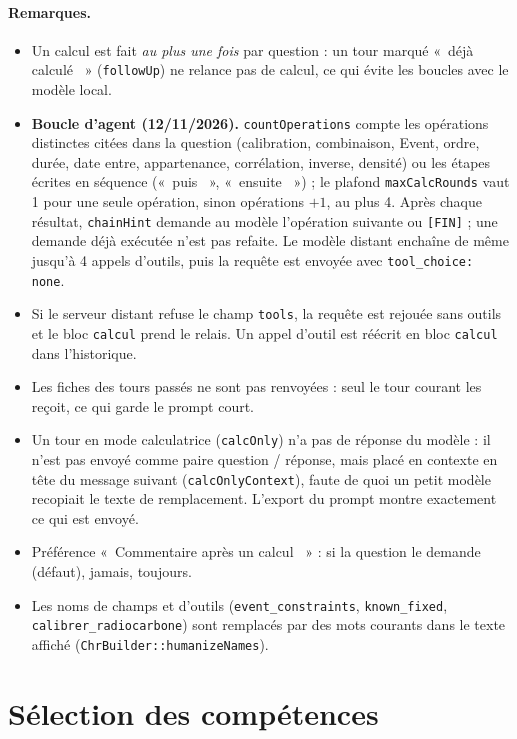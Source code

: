 \documentclass[11pt,a4paper]{article}
\providecommand{\og}{«~}\providecommand{\fg}{\unskip~»}
\newcommand{\code}[1]{\texttt{\small #1}}
\begin{document}
\paragraph{Remarques.}
\begin{itemize}[leftmargin=*]
\item Un calcul est fait \emph{au plus une fois} par question : un tour marqué \og déjà calculé \fg{} (\code{followUp})
  ne relance pas de calcul, ce qui évite les boucles avec le modèle local.
\item \textbf{Boucle d'agent (12/11/2026).} \code{countOperations} compte les opérations distinctes citées dans la
  question (calibration, combinaison, Event, ordre, durée, date entre, appartenance, corrélation, inverse, densité) ou
  les étapes écrites en séquence (\og puis \fg, \og ensuite \fg) ; le plafond \code{maxCalcRounds} vaut 1 pour une
  seule opération, sinon opérations $+1$, au plus 4. Après chaque résultat, \code{chainHint} demande au modèle
  l'opération suivante ou \code{[FIN]} ; une demande déjà exécutée n'est pas refaite. Le modèle distant enchaîne de
  même jusqu'à 4 appels d'outils, puis la requête est envoyée avec \code{tool\_choice: none}.
\item Si le serveur distant refuse le champ \code{tools}, la requête est rejouée sans outils et le bloc \code{calcul}
  prend le relais. Un appel d'outil est réécrit en bloc \code{calcul} dans l'historique.
\item Les fiches des tours passés ne sont pas renvoyées : seul le tour courant les reçoit, ce qui garde le prompt court.
\item Un tour en mode calculatrice (\code{calcOnly}) n'a pas de réponse du modèle : il n'est pas envoyé comme paire
  question / réponse, mais placé en contexte en tête du message suivant (\code{calcOnlyContext}), faute de quoi un petit
  modèle recopiait le texte de remplacement. L'export du prompt montre exactement ce qui est envoyé.
\item Préférence \og Commentaire après un calcul \fg{} : si la question le demande (défaut), jamais, toujours.
\item Les noms de champs et d'outils (\code{event\_constraints}, \code{known\_fixed}, \code{calibrer\_radiocarbone})
  sont remplacés par des mots courants dans le texte affiché (\code{ChrBuilder::humanizeNames}).
\end{itemize}

\section{Sélection des compétences}\label{sec:skills}
\end{document}
